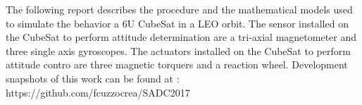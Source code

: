 The following report describes the procedure and the mathematical models used to simulate the behavior a 6U CubeSat in a LEO orbit.
The sensor installed on the CubeSat to perform attitude determination are a tri-axial magnetometer and three single axis gyroscopes. 
The actuators installed on the CubeSat to perform attitude contro are three magnetic torquers and a reaction wheel.
Development snapshots of this work can be found at : https://github.com/fcuzzocrea/SADC2017
